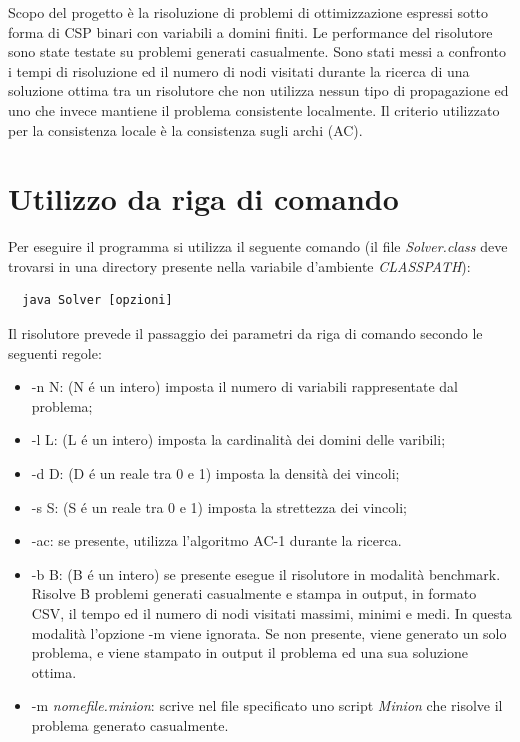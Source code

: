 \documentclass[a4paper,12pt,italian]{article}
\begin{document}
Scopo del progetto \`e la risoluzione di problemi di ottimizzazione
espressi sotto forma di CSP binari con variabili a domini finiti. Le
performance del risolutore sono state testate su problemi generati
casualmente. Sono stati messi a confronto i tempi di risoluzione ed il
numero di nodi visitati durante la ricerca di una soluzione ottima tra
un risolutore che non utilizza nessun tipo di propagazione ed uno che
invece mantiene il problema consistente localmente. Il criterio
utilizzato per la consistenza locale \`e la consistenza sugli archi
(AC).

\section{Utilizzo da riga di comando}

Per eseguire il programma si utilizza il seguente comando (il file
\textit{Solver.class} deve trovarsi in una directory presente nella
variabile d'ambiente \textit{CLASSPATH}):
\begin{verbatim}
  java Solver [opzioni]
\end{verbatim}

Il risolutore prevede il passaggio dei parametri da riga di comando secondo
le seguenti regole:

\begin{itemize}
 \item -n N: (N \'e un intero) imposta il numero di variabili rappresentate dal problema;
 \item -l L: (L \'e un intero) imposta la cardinalit\`a dei domini delle varibili;
 \item -d D: (D \'e un reale tra 0 e 1) imposta la densit\`a dei vincoli;
 \item -s S: (S \'e un reale tra 0 e 1) imposta la strettezza dei vincoli;
 \item -ac: se presente, utilizza l'algoritmo AC-1 durante la ricerca.
 \item -b B: (B \'e un intero) se presente esegue il risolutore in
   modalit\`a benchmark. Risolve B problemi generati casualmente e
   stampa in output, in formato CSV, il tempo ed il numero di nodi
   visitati massimi, minimi e medi. In questa modalit\`a l'opzione -m
   viene ignorata. Se non presente, viene generato un solo problema, e
   viene stampato in output il problema ed una sua soluzione ottima.
 \item -m \textit{nomefile.minion}: scrive nel file specificato uno
   script \textit{Minion} che risolve il problema generato casualmente.
\end{itemize}
\end{document}
